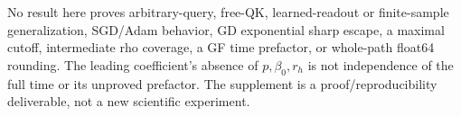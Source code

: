 \documentclass[11pt,a4paper]{article}
\begin{document}
No result here proves arbitrary-query, free-QK, learned-readout or finite-sample generalization, SGD/Adam behavior, GD exponential sharp escape, a maximal cutoff, intermediate rho coverage, a GF time prefactor, or whole-path float64 rounding. The leading coefficient's absence of $p,\beta_0,r_h$ is not independence of the full time or its unproved prefactor. The supplement is a proof/reproducibility deliverable, not a new scientific experiment.
\end{document}
